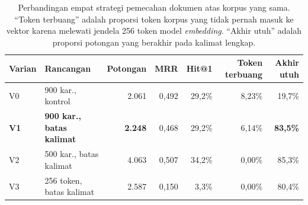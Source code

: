 %
%
\begin{table}[htbp]
\centering
\caption{Perbandingan empat strategi pemecahan dokumen atas korpus yang sama. ``Token terbuang'' adalah proporsi token korpus yang tidak pernah masuk ke vektor karena melewati jendela 256 token model \emph{embedding}. ``Akhir utuh'' adalah proporsi potongan yang berakhir pada kalimat lengkap.}
\label{tab:strategi-chunking}
\small
\begin{tabularx}{\textwidth}{@{}lLrrrrr@{}}
\toprule
\textbf{Varian} & \textbf{Rancangan} & \textbf{Potongan} & \textbf{MRR} & \textbf{Hit@1} & \textbf{Token terbuang} & \textbf{Akhir utuh} \\
\midrule
V0 & 900 kar., kontrol & 2.061 & 0,492 & 29,2\% & 8,23\% & 19,7\% \\
\textbf{V1} & \textbf{900 kar., batas kalimat} & \textbf{2.248} & 0,468 & 29,2\% & 6,14\% & \textbf{83,5\%} \\
V2 & 500 kar., batas kalimat & 4.063 & 0,507 & 34,2\% & 0,00\% & 85,3\% \\
V3 & 256 token, batas kalimat & 2.587 & 0,150 & 3,3\% & 0,00\% & 80,4\% \\
\bottomrule
\end{tabularx}


\end{table}
